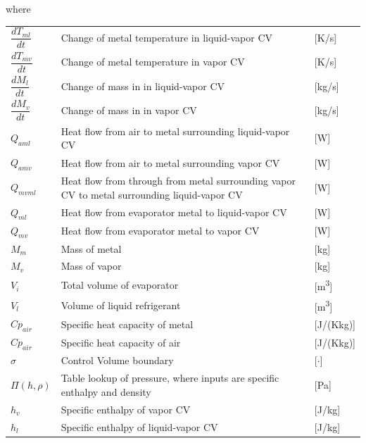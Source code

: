 where\\


\begin{center}
	\begin{tabular}{l p{10cm} l}
		$\dfrac{d T_{ml}}{dt} $		& Change of metal temperature in liquid-vapor CV  			& [\si{K}/\si{s}] \\[0.3cm]		
		$\dfrac{d T_{mv}}{dt} $		& Change of metal temperature in vapor CV					& [\si{K}/\si{s}] \\[0.3cm]		
		$\dfrac{d M_{l}}{dt} $		& Change of mass in	in liquid-vapor CV 						& [\si{kg}/\si{s}] \\[0.3cm]		
		$\dfrac{d M_{v}}{dt} $		& Change of mass in	in vapor CV								& [\si{kg}/\si{s}] \\[0.3cm]		
		$Q_{aml}$					& Heat flow from air to metal surrounding liquid-vapor CV	& [\si{W}] \\	
		$Q_{amv}$					& Heat flow from air to metal surrounding vapor CV			& [\si{W}] \\		
		$Q_{mvml}$					& Heat flow from through from metal surrounding vapor CV to metal surrounding liquid-vapor CV			& [\si{W}] \\	
		$Q_{ml}$					& Heat flow from evaporator metal to liquid-vapor CV		& [\si{W}] \\	
		$Q_{mv}$					& Heat flow from evaporator metal to vapor CV				& [\si{W}] \\				
		$M_{m} $					& Mass of metal												& [\si{kg}] \\	
		$M_{v} $					& Mass of vapor												& [\si{kg}] \\	
		$V_{i} $					& Total volume of evaporator								& [\si{m^3}] \\	
		$V_{l} $					& Volume of liquid refrigerant								& [\si{m^3}] \\	
		$Cp_{air}$					& Specific heat capacity of metal							& [\si{J}/(\si{K}\si{kg})] \\	
		$Cp_{air}$					& Specific heat capacity of air								& [\si{J}/(\si{K}\si{kg})] \\	
		$\sigma$					& Control Volume boundary 									& [$\cdot$] \\		
		$\Pi(h,\rho) $						& Table lookup of pressure, where inputs are specific enthalpy and density								& [\si{Pa}] \\	
		$h_{v} $					& Specific enthalpy of vapor CV								& [\si{J}/\si{kg}] \\	
		$h_{l} $					& Specific enthalpy of liquid-vapor CV						& [\si{J}/\si{kg}] \\	

\end{tabular}
\end{center}
